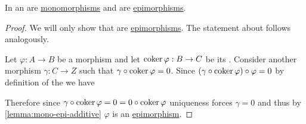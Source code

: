 \documentclass[../../main]{subfiles}
\begin{document}
\begin{lemma}
  In an   are \hyperref[def:mono-epi-morphism]{monomorphisms} and  are \hyperref[def:mono-epi-morphism]{epimorphisms}.
\end{lemma}
\begin{proof}
  We will only show that  are \hyperref[def:mono-epi-morphism]{epimorphisms}. The statement about  follows analogously.

  Let \(\varphi: A \to B\) be a morphism and let \(\operatorname*{coker} \varphi: B \to C\) be its .
  Consider another morphism \(\gamma: C \to Z\) such that \(\gamma \circ \operatorname*{coker} \varphi = 0\).
  Since \((\gamma \circ \operatorname*{coker} \varphi) \circ \varphi = 0\) by definition of the  we have
  \begin{center}
  \end{center}
  Therefore since \(\gamma \circ \operatorname*{coker} \varphi = 0 = 0 \circ \operatorname*{coker} \varphi\) uniqueness forces \(\gamma = 0\) and thus by \autoref{lemma:mono-epi-additive} \(\varphi\) is an \hyperref[def:mono-epi-morphism]{epimorphism}.
\end{proof}
\end{document}
